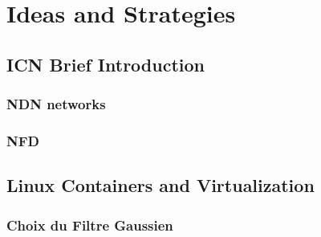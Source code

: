 \documentclass[8pt]{beamer}
\newcommand{\1}{\mathbbm 1}
\begin{document}
\section{Ideas and Strategies}

\subsection{ICN Brief Introduction}

\subsubsection{NDN networks}


\subsubsection{NFD}


\subsection{Linux Containers and Virtualization}

\subsubsection{Choix du Filtre Gaussien}
\end{document}

